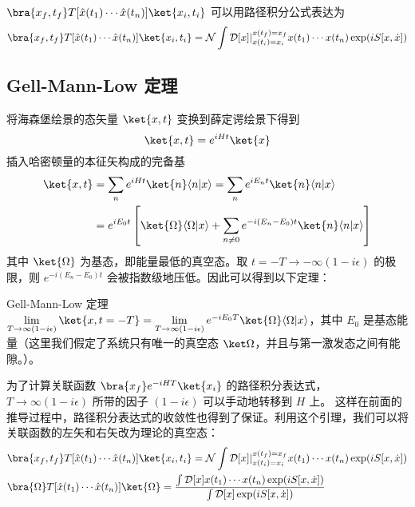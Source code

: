 \begin{theorem}{}
$\bra{x_f,t_f} T[\hat x(t_1)\cdots \hat x(t_n)]\ket{x_i,t_i}$ 可以用路径积分公式表达为
\begin{equation}
\begin{aligned}
        \bra{x_f,t_f} T[\hat x(t_1)\cdots \hat x(t_n)]\ket{x_i,t_i}=
        \mathcal{N}\int \mathcal{D}[x]|_{x(t_i)=x_i}^{x(t_f)=x_f} x(t_1)\cdots x(t_n) \exp(i S[x,\dot x])
\end{aligned}
\end{equation}
\end{theorem}
\subsection{Gell-Mann-Low 定理}
将海森堡绘景的态矢量 $\ket{x,t}$ 变换到薛定谔绘景下得到
\begin{equation}
\ket{x,t}=e^{iHt}\ket{x}
\end{equation}
插入哈密顿量的本征矢构成的完备基
\begin{equation}
\begin{aligned}
\ket{x,t}&=\sum_n e^{iHt}\ket{n}\langle n|x\rangle=
\sum_n e^{iE_n t}\ket{n}\langle n|x\rangle\\
&=e^{iE_0t}\left[\ket{\Omega}\langle\Omega|x\rangle+\sum_{n\neq 0}e^{-i(E_n-E_0)t}\ket{n}\langle n|x\rangle\right]
\end{aligned}
\end{equation}
其中 $\ket{\Omega}$ 为基态，即能量最低的真空态。取 $t=-T\rightarrow -\infty(1-i\epsilon)$ 的极限，则 $e^{-i(E_n-E_0) t}$ 会被指数级地压低。因此可以得到以下定理：
\begin{theorem}{Gell-Mann-Low 定理}
$\lim\limits_{T\rightarrow \infty(1-i\epsilon)}\ket{x,t=-T}=
    \lim\limits_{T\rightarrow \infty(1-i\epsilon)}
    e^{-iE_0T}\ket{\Omega}\langle \Omega|x\rangle$，其中 $E_0$ 是基态能量（这里我们假定了系统只有唯一的真空态 $\ket \Omega$，并且与第一激发态之间有能隙。）。
\end{theorem}
为了计算关联函数 $\bra{x_f}e^{-iHT}\ket{x_i}$ 的路径积分表达式，$T\rightarrow \infty(1-i\epsilon)$ 所带的因子 $(1-i\epsilon)$ 可以手动地转移到 $H$ 上。
这样在前面的推导过程中，路径积分表达式的收敛性也得到了保证。利用这个引理，我们可以将关联函数的左矢和右矢改为理论的真空态：
\begin{equation}
\begin{aligned}
&\bra{x_f,t_f} T[\hat x(t_1)\cdots \hat x(t_n)]\ket{x_i,t_i}=
        \mathcal{N}\int \mathcal{D}[x]|_{x(t_i)=x_i}^{x(t_f)=x_f} x(t_1)\cdots x(t_n) \exp(i S[x,\dot x])\\
&\bra{\Omega} T[\hat x(t_1)\cdots \hat x(t_n)]\ket{\Omega}
=\frac{\int \mathcal{D}[x] x(t_1)\cdots x(t_n) \exp(i S[x,\dot x])}
{\int \mathcal{D}[x]\exp(i S[x,\dot x])}
\end{aligned}
\end{equation}
